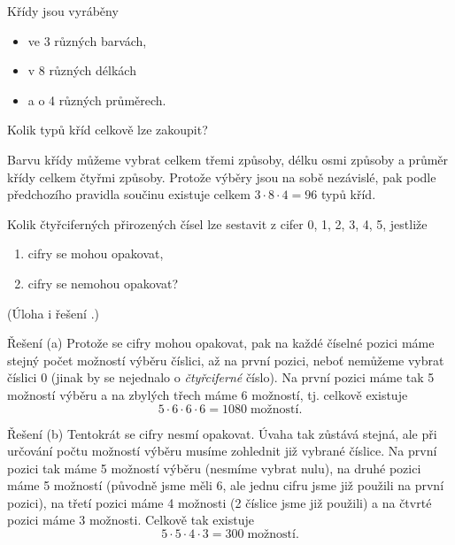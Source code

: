\begin{exercise}
    Křídy jsou vyráběny
    \begin{itemize}
        \item ve 3 různých barvách,
        \item v 8 různých délkách
        \item a o 4 různých průměrech.
    \end{itemize}
    Kolik typů kříd celkově lze zakoupit? \citep[str. 29]{Brualdi2018}
\end{exercise}
\begin{solution}
    Barvu křídy můžeme vybrat celkem třemi způsoby, délku osmi způsoby a průměr křídy celkem čtyřmi způsoby. Protože výběry jsou na sobě nezávislé, pak podle předchozího pravidla součinu existuje celkem $3\cdot 8\cdot 4=96$ typů kříd.
\end{solution}

\begin{exercise}
    Kolik čtyřciferných přirozených čísel lze sestavit z cifer 0, 1, 2, 3, 4, 5, jestliže
    \begin{enumerate}[label=(\alph*)]
        \item cifry se mohou opakovat,
        \item cifry se nemohou opakovat?
    \end{enumerate}
    (Úloha i řešení \citep[str. 7]{Slavik2022}.)
\end{exercise}
\begin{solution}{Řešení (a)}
    Protože se cifry mohou opakovat, pak na každé číselné pozici máme stejný počet možností výběru číslici, až na první pozici, neboť nemůžeme vybrat číslici 0 (jinak by se nejednalo o \emph{čtyřciferné} číslo). Na první pozici máme tak 5 možností výběru a na zbylých třech máme 6 možností, tj. celkově existuje
    \begin{equation*}
        5\cdot 6\cdot 6\cdot 6 = 1080\;\text{možností.}
    \end{equation*}
\end{solution}
\begin{solution}{Řešení (b)}
    Tentokrát se cifry nesmí opakovat. Úvaha tak zůstává stejná, ale při určování počtu možností výběru musíme zohlednit již vybrané číslice. Na první pozici tak máme 5 možností výběru (nesmíme vybrat nulu), na druhé pozici máme 5 možností (původně jsme měli 6, ale jednu cifru jsme již použili na první pozici), na třetí pozici máme 4 možnosti (2 číslice jsme již použili) a na čtvrté pozici máme 3 možnosti. Celkově tak existuje
    \begin{equation*}
        5\cdot 5\cdot 4\cdot 3=300\;\text{možností.}
    \end{equation*}
\end{solution}

